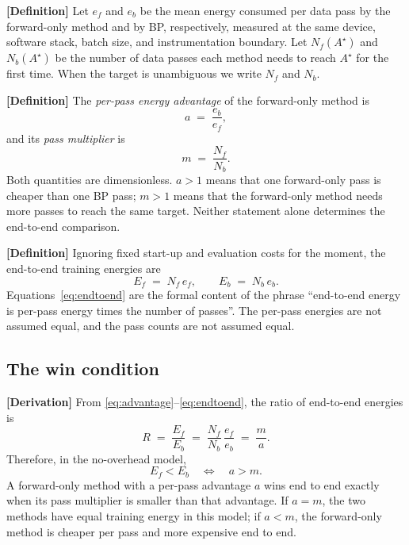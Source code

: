\textbf{[Definition]} Let $e_f$ and $e_b$ be the mean energy consumed per data
pass by the forward-only method and by BP, respectively, measured at the same
device, software stack, batch size, and instrumentation boundary.  Let
$N_f(A^\star)$ and $N_b(A^\star)$ be the number of data passes each method needs
to reach $A^\star$ for the first time.  When the target is unambiguous we write
$N_f$ and $N_b$.

\textbf{[Definition]} The \emph{per-pass energy advantage} of the forward-only
method is
\begin{equation}
  a \;=\; \frac{e_b}{e_f},
  \label{eq:advantage}
\end{equation}
and its \emph{pass multiplier} is
\begin{equation}
  m \;=\; \frac{N_f}{N_b}.
  \label{eq:multiplier}
\end{equation}
Both quantities are dimensionless.  $a>1$ means that one forward-only pass is
cheaper than one BP pass; $m>1$ means that the forward-only method needs more
passes to reach the same target.  Neither statement alone determines the
end-to-end comparison.

\textbf{[Definition]} Ignoring fixed start-up and evaluation costs for the
moment, the end-to-end training energies are
\begin{equation}
  E_f \;=\; N_f\,e_f,
  \qquad
  E_b \;=\; N_b\,e_b .
  \label{eq:endtoend}
\end{equation}
Equations~\eqref{eq:endtoend} are the formal content of the phrase
``end-to-end energy is per-pass energy times the number of passes''.  The
per-pass energies are not assumed equal, and the pass counts are not assumed
equal.

\subsection{The win condition}

\textbf{[Derivation]} From \eqref{eq:advantage}--\eqref{eq:endtoend}, the ratio
of end-to-end energies is
\begin{equation}
  R \;=\; \frac{E_f}{E_b}
      \;=\; \frac{N_f}{N_b}\,\frac{e_f}{e_b}
      \;=\; \frac{m}{a}.
  \label{eq:ratio}
\end{equation}
Therefore, in the no-overhead model,
\begin{equation}
  E_f < E_b
  \quad\Longleftrightarrow\quad
  a > m .
  \label{eq:win}
\end{equation}
A forward-only method with a per-pass advantage $a$ wins end to end exactly
when its pass multiplier is smaller than that advantage.  If $a=m$, the two
methods have equal training energy in this model; if $a<m$, the forward-only
method is cheaper per pass and more expensive end to end.


